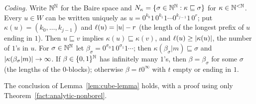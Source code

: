 \emph{Coding.} Write $\mathbb{N}^{\mathbb{N}}$ for the Baire space and $N_\kappa=\{\sigma\in\mathbb{N}^{\mathbb{N}}:\kappa\sqsubseteq\sigma\}$ for $\kappa\in\mathbb{N}^{<\mathbb{N}}$.
Every $u\in W$ can be written uniquely as $u=0^{k_0}1\,0^{k_1}1\cdots0^{k_{j-1}}1\,0^r$; put $\kappa(u)=(k_0,\dots,k_{j-1})$ and
$\ell(u)=\lvert u\rvert-r$ (the length of the longest prefix of $u$ ending in $1$). Then $u\sqsubseteq v$ implies $\kappa(u)\sqsubseteq\kappa(v)$, and
$\ell(u)\ge\lvert \kappa(u)\rvert$, the number of $1$'s in $u$. For $\sigma\in\mathbb{N}^{\mathbb{N}}$ let
$\beta_\sigma=0^{\sigma_0}1\,0^{\sigma_1}1\cdots$; then $\kappa(\beta_\sigma|m)\sqsubseteq\sigma$ and $\lvert \kappa(\beta_\sigma|m)\rvert\to\infty$. If
$\beta\in\{0,1\}^{\mathbb{N}}$ has infinitely many $1$'s, then $\beta=\beta_\sigma$ for some $\sigma$ (the lengths of the $0$-blocks); otherwise
$\beta=t0^\infty$ with $t$ empty or ending in $1$.

\begin{lemma}\label{lem:cube-lemma-elementary}
The conclusion of Lemma~\ref{lem:cube-lemma} holds, with a proof using only Theorem~\ref{fact:analytic-nonborel}.
\end{lemma}
